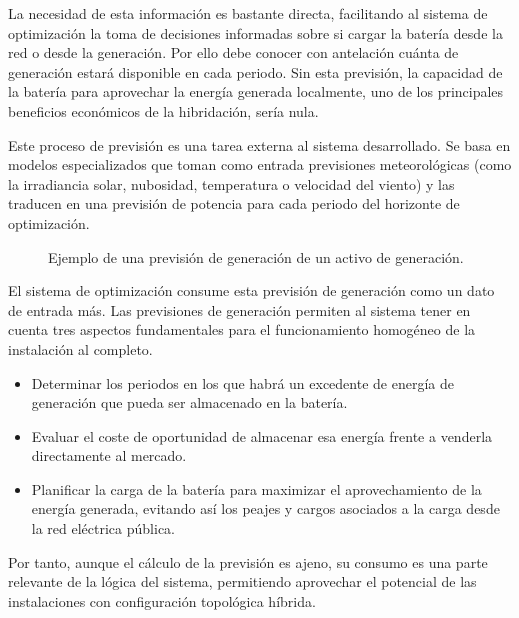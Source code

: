 La necesidad de esta información es bastante directa, facilitando al sistema de optimización la toma de decisiones informadas sobre si cargar la batería desde la red o desde la generación. Por ello debe conocer con antelación cuánta de generación estará disponible en cada periodo. Sin esta previsión, la capacidad de la batería para aprovechar la energía generada localmente, uno de los principales beneficios económicos de la hibridación, sería nula.

Este proceso de previsión es una tarea externa al sistema desarrollado. Se basa en modelos especializados que toman como entrada previsiones meteorológicas (como la irradiancia solar, nubosidad, temperatura o velocidad del viento) y las traducen en una previsión de potencia para cada periodo del horizonte de optimización.

\begin{figure}
  \centering
  \caption[Previsión de generación de un activo.]{Ejemplo de una previsión de generación de un activo de generación.}
  \label{fig:prevision-renovable}
\end{figure}

El sistema de optimización consume esta previsión de generación como un dato de entrada más. Las previsiones de generación permiten al sistema tener en cuenta tres aspectos fundamentales para el funcionamiento homogéneo de la instalación al completo.

\begin{itemize}

  \item Determinar los periodos en los que habrá un excedente de energía de generación que pueda ser almacenado en la batería.

  \item Evaluar el coste de oportunidad de almacenar esa energía frente a venderla directamente al mercado.

  \item Planificar la carga de la batería para maximizar el aprovechamiento de la energía generada, evitando así los peajes y cargos asociados a la carga desde la red eléctrica pública.

\end{itemize}

Por tanto, aunque el cálculo de la previsión es ajeno, su consumo es una parte relevante de la lógica del sistema, permitiendo aprovechar el potencial de las instalaciones con configuración topológica híbrida.

